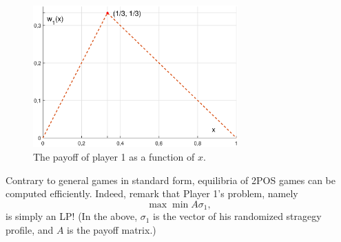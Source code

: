 \begin{example}
\begin{figure}[!ht]
\centering
\includegraphics[width = 0.7\textwidth]{figP2OS.eps}
\caption{The payoff of player 1 as a function of $x$.}
\label{chap3:figP2OS}
\end{figure}


\end{example}
Contrary to general games in standard form, equilibria of 2POS games can be computed efficiently.  Indeed, remark that Player 1's problem, namely $$ \max{\min{ A \sigma_1}} ,$$ is simply an LP!  (In the above, $\sigma_1$ is the vector of his randomized stragegy profile, and $A$ is the payoff matrix.)


\ifx \globalmark \undefined %


	
\else 
	
\fi